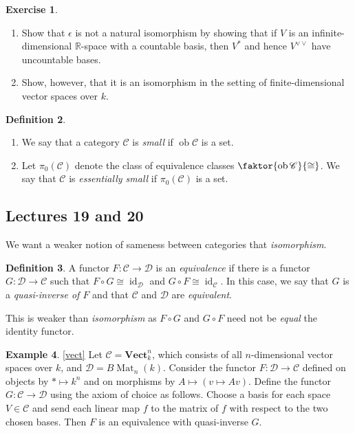 \documentclass[10pt,letterpaper,cm]{nupset}
\theoremstyle{definition}
\newtheorem{definition}{Definition}[subsection]
\newtheorem{exmp}[definition]{Example}
\theoremstyle{theorem}
\newtheorem{exercise}[definition]{Exercise}
\theoremstyle{remark}
\newcommand{\R}{\mathbb R}
\newcommand{\1}{\mathbf{1}}
\renewcommand{\c}{\mathscr{C}}
\renewcommand{\d}{\mathscr{D}}
\newcommand{\0}{\vec 0}
\DeclareMathOperator{\id}{\mathrm{id}}
\DeclareMathOperator{\ob}{ob}
\DeclareMathOperator{\Mat}{Mat}
\begin{document}
\begin{exercise}  $ $
\begin{enumerate} 
\item Show that $\epsilon$ is not a natural isomorphism by showing that if $V$ is an infinite-dimensional $\R$-space with a countable basis, then $V^{\ast}$ and hence $V^{\vee \vee}$ have uncountable bases.
\item Show, however, that it is an isomorphism in the setting of finite-dimensional vector spaces over $k$.
\end{enumerate}
\end{exercise}

\begin{definition} $ $
\begin{enumerate}
\item We say that a category $\c$ is \textit{small} if $\ob{\c}$ is a set.
\item Let $\pi_0(\c)$ denote the class of equivalence classes $\faktor{\ob \c}{\cong}$. We say that $\c$ is \textit{essentially small} if $\pi_0(\c)$ is a set.
\end{enumerate}
\end{definition}

\subsection{Lectures 19 and 20}

We want a weaker notion of sameness between categories that \textit{isomorphism}.

\begin{definition}
A functor $F: \c \to \d$ is an \textit{equivalence} if there is a functor $G: \d \to \c$ such that $F \circ G \cong \id_{\d}$ and $G\circ F \cong \id_{\c}$. In this case, we say that $G$ is a \textit{quasi-inverse of $F$} and that $\c$ and $\d$ are \textit{equivalent}.
\end{definition}

This is weaker than \textit{isomorphism} as $F\circ G$ and $G\circ F$ need not be \textit{equal} the identity functor.

\smallskip

\begin{exmp}\cref{vect}
Let $\c = \mathbf{Vect}_k^n$, which consists of all $n$-dimensional vector spaces over $k$, and $\d =  B{\Mat_n(k)}$. Consider the functor $F : \d \to \c$ defined on objects by $\ast \mapsto k^n$ and on morphisms by $A \mapsto \left(v \mapsto Av\right)$. Define the functor $G: \c \to \d$ using the axiom of choice as follows. Choose a basis for each space $V \in \c$ and send each linear map $f$ to the matrix of $f$ with respect to the two chosen bases. Then $F$ is an equivalence with quasi-inverse $G$.
\end{exmp}
\end{document}

